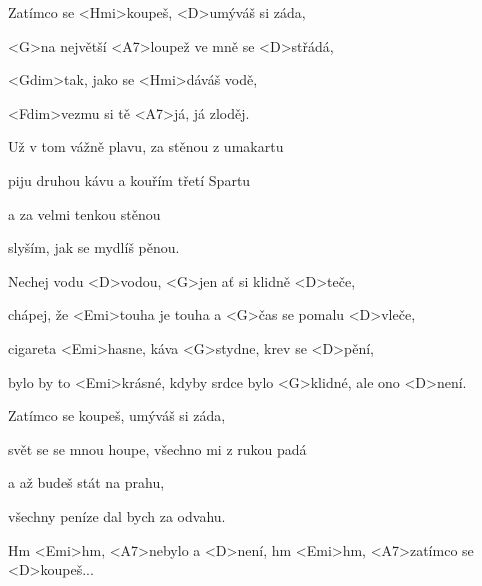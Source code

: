 

\zs
Zatímco se <Hmi>koupeš, <D>umýváš si záda,

<G>na největší <A7>loupež ve mně se <D>střádá,

<Gdim>tak, jako se <Hmi>dáváš vodě,

<Fdim>vezmu si tě <A7>já, já zloděj.
\ks

\zs
Už v tom vážně plavu, za stěnou z umakartu

piju druhou kávu a kouřím třetí Spartu

a za velmi tenkou stěnou

slyším, jak se mydlíš pěnou.
\ks

\zr
Nechej vodu <D>vodou, <G>jen ať si klidně <D>teče,

chápej, že <Emi>touha je touha a <G>čas se pomalu <D>vleče,

cigareta <Emi>hasne, káva <G>stydne, krev se <D>pění,

bylo by to <Emi>krásné, kdyby srdce bylo <G>klidné, ale ono <D>není.
\kr

\zs
Zatímco se koupeš, umýváš si záda,

svět se se mnou houpe, všechno mi z rukou padá

a až budeš stát na prahu,

všechny peníze dal bych za odvahu.
\ks

\zr
\kr

Hm <Emi>hm, <A7>nebylo a <D>není, hm <Emi>hm, <A7>zatímco se <D>koupeš...

\kp
